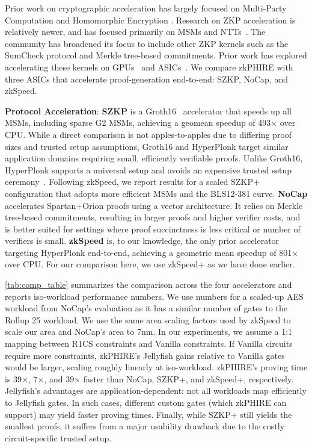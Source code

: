 Prior work on cryptographic acceleration has largely focused on Multi-Party Computation and Homomorphic Encryption \cite{kim2022_BTS, sharp, rpu, haac, karthik1, karthik2, ciflow, mo2023towards, ark, jha2024deepreshape, osiris, anaheim}.
Research on ZKP acceleration is relatively newer, and has focused primarily on MSMs and NTTs~\cite{priormsm, distmsm, cuzk, rezk, legozk, unizk, pipezk, gzkp, gypso, MSMAC, tches_ntt_msm, zhang2025code, zhang2025micro, elastic_msm, sam, myosotis, graz, prophet}.
The community has broadened its focus to include other ZKP kernels such as the SumCheck protocol and Merkle tree-based commitments.
Prior work has explored accelerating these kernels on GPUs~\cite{batchzk} and ASICs~\cite{nocap, zkspeed2025}.
We compare zkPHIRE with three ASICs that accelerate proof-generation end-to-end: SZKP, NoCap, and zkSpeed.

\textbf{Protocol Acceleration}:
\textbf{SZKP} is a Groth16~\cite{groth16} accelerator that speeds up all MSMs, including sparse G2 MSMs, achieving a geomean speedup of 493× over CPU. While a direct comparison is not apples-to-apples due to differing proof sizes and trusted setup assumptions, Groth16 and HyperPlonk target similar application domains requiring small, efficiently verifiable proofs. Unlike Groth16, HyperPlonk supports a universal setup and avoids an expensive trusted setup ceremony~\cite{ceremony}. Following zkSpeed, we report results for a scaled SZKP+ configuration that adopts more efficient MSMs and the BLS12-381 curve.
\textbf{NoCap} accelerates Spartan+Orion proofs using a vector architecture. It relies on Merkle tree-based commitments, resulting in larger proofs and higher verifier costs, and is better suited for settings where proof succinctness is less critical or number of verifiers is small.
\textbf{zkSpeed} is, to our knowledge, the only prior accelerator targeting HyperPlonk end-to-end, achieving a geometric mean speedup of 801× over CPU. For our comparison here, we use zkSpeed+ as we have done earlier. 

\autoref{tab:comp_table} summarizes the comparison across the four accelerators and reports iso-workload performance numbers.
We use numbers for a scaled-up AES workload from NoCap's evaluation as it has a similar number of gates to the Rollup 25 workload. 
We use the same area scaling factors used by zkSpeed to scale our area and NoCap's area to 7nm.
In our experiments, we assume a 1:1 mapping between R1CS constraints and Vanilla constraints. If Vanilla circuits require more constraints, zkPHIRE’s Jellyfish gains relative to Vanilla gates would be larger, scaling roughly linearly at iso-workload.
zkPHIRE's proving time is 39$\times$, 7$\times$, and 39$\times$ faster than NoCap, SZKP+, and zkSpeed+, respectively.
Jellyfish's advantages are application-dependent: not all workloads map efficiently to Jellyfish gates. In such cases, different custom gates (which zkPHIRE can support) may yield faster proving times. 
Finally, while SZKP+ still yields the smallest proofs, it suffers from a major usability drawback due to the costly circuit-specific trusted setup.

